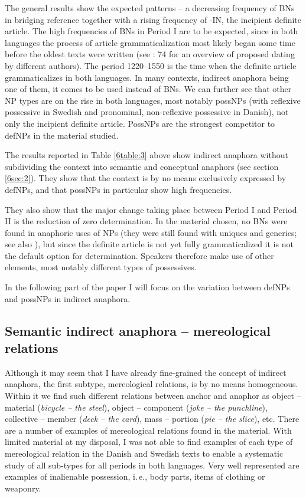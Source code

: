 \documentclass[output=paper]{langsci/langscibook}
\begin{document}
The general results show the expected patterns -- a decreasing frequency of BNs in bridging reference together with a rising frequency of -IN, the incipient definite article. The high frequencies of BNs in Period I are to be expected, since in both languages the process of article grammaticalization most likely began some time before the oldest texts were written (see \citealt{skrzypek:12}: 74 for an overview of proposed dating by different authors). The period 1220--1550 is the time when the definite article grammaticalizes in both languages. In many contexts, indirect anaphora being one of them, it comes to be used instead of BNs. We can further see that other NP types are on the rise in both languages, most notably possNPs (with reflexive possessive in Swedish and pronominal, non-reflexive possessive in Danish), not only the incipient definite article. PossNPs are the strongest competitor to defNPs in the material studied. 

The results reported in Table \ref{6table:3} above show indirect anaphora without subdividing the context into semantic and conceptual anaphors (see section \ref{6sec:2}). They show that the context is by no means exclusively expressed by defNPs, and that possNPs in particular show high frequencies.

They also show that the major change taking place between Period I and Period II is the reduction of zero determination. In the material chosen, no BNs were found in anaphoric uses of NPs (they were still found with uniques and generics; see also \citealt{skrzypek:12}), but since the definite article is not yet fully grammaticalized it is not the default option for determination. Speakers therefore make use of other elements, most notably different types of possessives. 

In the following part of the paper I will focus on the variation between defNPs and possNPs in indirect anaphora.


\subsection{Semantic indirect anaphora -- mereological relations}\label{6sec:41}

Although it may seem that I have already fine-grained the concept of indirect anaphora, the first subtype, mereological relations, is by no means homogeneous. Within it we find such different relations between anchor and anaphor as object -- material ({\emph{bicycle -- the steel}}), object -- component ({\emph{joke -- the punchline}}), collective -- member ({\emph{deck -- the card}}), mass -- portion ({\emph{pie -- the slice}}), etc. There are a number of examples of mereological relations found in the material. With limited material at my disposal, I was not able to find examples of each type of mereological relation in the Danish and Swedish texts to enable a systematic study of all sub-types for all periods in both languages. Very well represented are examples of inalienable possession, i.\,e., body parts, items of clothing or weaponry. 
\end{document}
